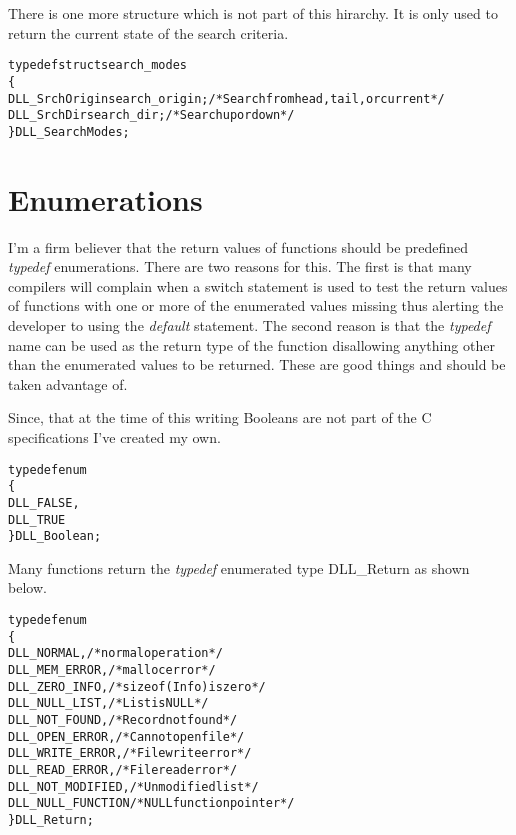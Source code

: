 \documentclass[10pt,letterpaper]{report}
\begin{document}
\noindent
There is one more structure which is not part of this hirarchy.  It is only used to return the current state of the search criteria.

\small
\begin{alltt}
typedef struct search_modes
   \{
   DLL_SrchOrigin search_origin; /* Search from head, tail, or current */
   DLL_SrchDir    search_dir;    /* Search up or down */
   \} DLL_SearchModes;
\end{alltt}
\normalsize

\chapter*{Enumerations}
I'm a firm believer that the return values of functions should be predefined \emph{typedef} enumerations.  There are two reasons for this.  The first is that many compilers will complain when a switch statement is used to test the return values of functions with one or more of the enumerated values missing thus alerting the developer to using the \emph{default} statement.   The second reason is that the \emph{typedef} name can be used as the return type of the function disallowing anything other than the enumerated values to be returned.  These are good things and should be taken advantage of.
\vspace{8pt}

\noindent
Since, that at the time of this writing Booleans are not part of the C specifications I've created my own.

\small
\begin{alltt}
typedef enum
   \{
   DLL_FALSE,
   DLL_TRUE
   \} DLL_Boolean;
\end{alltt}
\normalsize
\vspace{8pt}

\noindent
Many functions return the \emph{typedef} enumerated type DLL\_Return as shown below.

\small
\begin{alltt}
typedef enum
   \{
   DLL_NORMAL,            /* normal operation */
   DLL_MEM_ERROR,         /* malloc error */
   DLL_ZERO_INFO,         /* sizeof(Info) is zero */
   DLL_NULL_LIST,         /* List is NULL */
   DLL_NOT_FOUND,         /* Record not found */
   DLL_OPEN_ERROR,        /* Cannot open file */
   DLL_WRITE_ERROR,       /* File write error */
   DLL_READ_ERROR,        /* File read error */
   DLL_NOT_MODIFIED,      /* Unmodified list */
   DLL_NULL_FUNCTION      /* NULL function pointer */
   \} DLL_Return;
\end{alltt}
\normalsize
\vspace{8pt}
\end{document}
